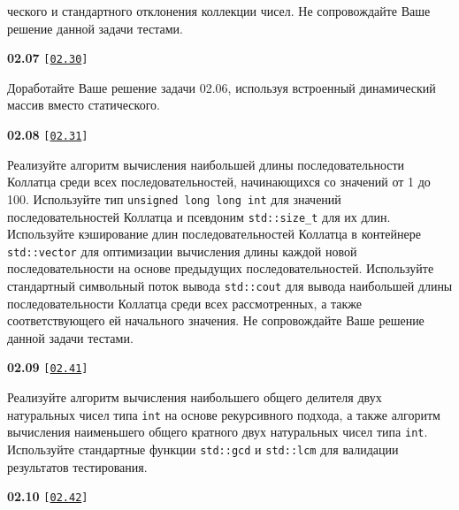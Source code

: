 \documentclass[a4paper,12pt]{article}
\begin{document}
ческого и стандартного отклонения коллекции чисел. Не сопровождайте Ваше решение данной задачи тестами.

\bigskip

{\large \textbf{02.07} \texttt{[\href{https://github.com/i-s-m-mipt/Education/blob/master/projects/examples/source/02.30.cpp}{\texttt{02.30}}]}}

\bigskip

Доработайте Ваше решение задачи 02.06, используя встроенный динамический массив вместо статического.

\bigskip

{\large \textbf{02.08} \texttt{[\href{https://github.com/i-s-m-mipt/Education/blob/master/projects/examples/source/02.31.cpp}{\texttt{02.31}}]}}

\bigskip

Реализуйте алгоритм вычисления наибольшей длины последовательности Коллатца среди всех последовательностей, начинающихся со значений от 1 до 100. Используйте тип \lstinline{unsigned long long int} для значений последовательностей Коллатца и псевдоним \lstinline{std::size_t} для их длин. Используйте кэширование длин последовательностей Коллатца в контейнере \lstinline{std::vector} для оптимизации вычисления длины каждой новой последовательности на основе предыдущих последовательностей. Используйте стандартный символьный поток вывода \lstinline{std::cout} для вывода наибольшей длины последовательности Коллатца среди всех рассмотренных, а также соответствующего ей начального значения. Не сопровождайте Ваше решение данной задачи тестами.

\bigskip

{\large \textbf{02.09} \texttt{[\href{https://github.com/i-s-m-mipt/Education/blob/master/projects/examples/source/02.41.cpp}{\texttt{02.41}}]}}

\bigskip

Реализуйте алгоритм вычисления наибольшего общего делителя двух натуральных чисел типа \lstinline{int} на основе рекурсивного подхода, а также алгоритм вычисления наименьшего общего кратного двух натуральных чисел типа \lstinline{int}. Используйте стандартные функции \lstinline{std::gcd} и \lstinline{std::lcm} для валидации результатов тестирования.

\bigskip

{\large \textbf{02.10} \texttt{[\href{https://github.com/i-s-m-mipt/Education/blob/master/projects/examples/source/02.42.cpp}{\texttt{02.42}}]}}

\bigskip
\end{document}
